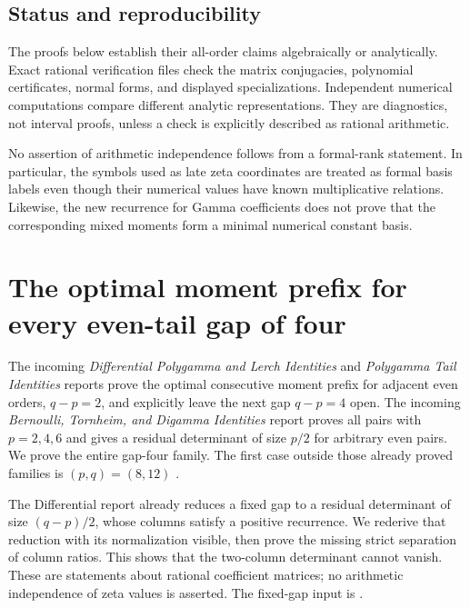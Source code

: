 \documentclass[11pt,letterpaper]{article}
\numberwithin{equation}{section}
\theoremstyle{plain}
\theoremstyle{definition}
\theoremstyle{remark}
\begin{document}
\subsection{Status and reproducibility}

The proofs below establish their all-order claims algebraically or
analytically. Exact rational verification files check the matrix
conjugacies, polynomial certificates, normal forms, and displayed
specializations. Independent numerical computations compare different
analytic representations. They are diagnostics, not interval proofs,
unless a check is explicitly described as rational arithmetic.

No assertion of arithmetic independence follows from a formal-rank
statement. In particular, the symbols used as late zeta coordinates
are treated as formal basis labels even though their numerical values
have known multiplicative relations. Likewise, the new recurrence for
Gamma coefficients does not prove that the corresponding mixed moments
form a minimal numerical constant basis.



\section{The optimal moment prefix for every even-tail gap of four}
\label{gap:section}

The incoming \emph{Differential Polygamma and Lerch Identities} and
\emph{Polygamma Tail Identities} reports prove the optimal consecutive
moment prefix for adjacent even orders, $q-p=2$, and explicitly leave
the next gap $q-p=4$ open. The incoming
\emph{Bernoulli, Tornheim, and Digamma Identities} report proves all
pairs with $p=2,4,6$ and gives a residual determinant of size $p/2$
for arbitrary even pairs. We prove the entire gap-four family. The
first case outside those already proved families is $(p,q)=(8,12)$
\cite{DPL,PTI,BTD}.

The Differential report already reduces a fixed gap to a residual
determinant of size $(q-p)/2$, whose columns satisfy a positive
recurrence. We rederive that reduction with its normalization visible,
then prove the missing strict separation of column ratios. This shows
that the two-column determinant cannot vanish. These are statements
about rational coefficient matrices; no arithmetic independence of
zeta values is asserted. The fixed-gap input is
\cite[\texttt{ar:gap-det}, \texttt{ar:gap-factor}]{DPL}.
\end{document}
